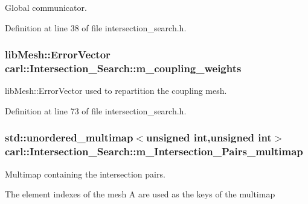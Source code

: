 Global communicator. 



Definition at line 38 of file intersection\+\_\+search.\+h.

\hypertarget{classcarl_1_1_intersection___search_a1d44cfde49ae719c406da8bd5c463992}{}
\subsubsection[{m\+\_\+coupling\+\_\+weights}]{\setlength{\rightskip}{0pt plus 5cm}lib\+Mesh\+::\+Error\+Vector carl\+::\+Intersection\+\_\+\+Search\+::m\+\_\+coupling\+\_\+weights\hspace{0.3cm}{\ttfamily [protected]}}\label{classcarl_1_1_intersection___search_a1d44cfde49ae719c406da8bd5c463992}


lib\+Mesh\+::\+Error\+Vector used to repartition the coupling mesh. 



Definition at line 73 of file intersection\+\_\+search.\+h.

\hypertarget{classcarl_1_1_intersection___search_a21bb47bfa3021d18b718919ad4a245d7}{}
\subsubsection[{m\+\_\+\+Intersection\+\_\+\+Pairs\+\_\+multimap}]{\setlength{\rightskip}{0pt plus 5cm}std\+::unordered\+\_\+multimap$<$unsigned int,unsigned int$>$ carl\+::\+Intersection\+\_\+\+Search\+::m\+\_\+\+Intersection\+\_\+\+Pairs\+\_\+multimap\hspace{0.3cm}{\ttfamily [protected]}}\label{classcarl_1_1_intersection___search_a21bb47bfa3021d18b718919ad4a245d7}


Multimap containing the intersection pairs. 

The element indexes of the mesh A are used as the keys of the multimap 

